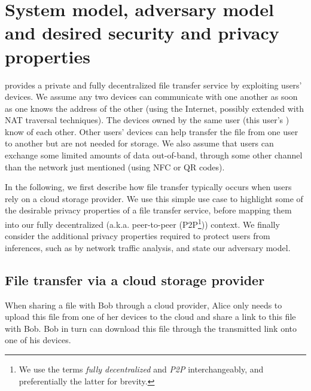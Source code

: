

\section{System model, adversary model and desired security and privacy properties}%
\label{system-model}

\name provides a private and fully decentralized file transfer service by exploiting 
users' devices.  We assume any two devices can communicate with one
another as soon as one knows the address of the other (\eg using the
Internet, possibly extended with NAT traversal techniques). The
devices owned by the same user (this user's \squad) know of each
other. Other users' devices can help transfer the file from one user
to another but are not needed for storage.  We also assume that users
can exchange some limited amounts of data out-of-band, \ie through
some other channel than the network just mentioned (\eg using \ac{NFC}
or QR codes).



In the following, we first describe how file transfer typically occurs
when users rely on a cloud storage provider. We use this simple use
case to highlight some of the desirable privacy properties of a file
transfer service, before mapping them into our fully decentralized
(a.k.a. peer-to-peer (P2P\footnote{We use the terms \emph{fully decentralized} and
  \emph{P2P} interchangeably, and preferentially the latter for brevity.}))
context.  We finally consider the additional privacy properties
required to protect users from inferences, such as by network traffic
analysis, and state our adversary model.

\subsection{File transfer via a cloud storage provider}

When sharing a file with Bob through a cloud provider, Alice only
needs to upload this file from one of her devices to the cloud and
share a link to this file with Bob. Bob in turn can download this file
through the transmitted link onto one of his devices.

